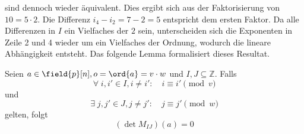 sind dennoch wieder äquivalent. Dies ergibt sich aus der Faktorisierung von $10 = 5 \cdot 2$. Die Differenz $i_4 - i_2 = 7 - 2 = 5$ entspricht dem ersten Faktor. Da alle Differenzen in $I$ ein Vielfaches der $2$ sein, unterscheiden sich die Exponenten in Zeile 2 und 4 wieder um ein Vielfaches der Ordnung, wodurch die lineare Abhängigkeit entsteht. Das folgende Lemma formalisiert dieses Resultat.



\begin{lemma} \label{lemma:equal-columns}
    Seien $a \in \field{p}[n], o = \ord{a} = v\cdot w$ und $I,J \subseteq \mathbb{Z}$.
    Falls
    \begin{equation} \label{equation:all-equal}
        \forall \; i, i' \in I, i \neq i':\quad i \equiv i' \pmod v
    \end{equation}
    und
    \begin{equation} \label{equation:two-equal}
        \exists \; j, j' \in J, j \neq j':\quad  j \equiv j' \pmod w
    \end{equation}
    gelten, folgt
    \begin{equation*}
        (\det M_{IJ})(a) = 0
    \end{equation*}
\end{lemma}

